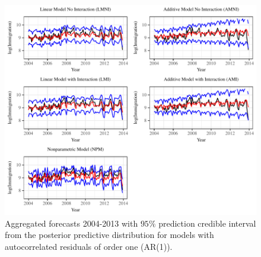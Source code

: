 \documentclass{article}\usepackage[]{graphicx}\usepackage[]{color}
\begin{document}
\begin{table} \centering 
\caption{2nd order Fourier models on Swiss Immigration Aggregated Data for Short and Long Run Predictions with AR(1) errors.} 
\label{RMSFE AR1} 
\end{table}

\begin{figure}[H]
\centering
\includegraphics[scale=1]{Short_run_results_AR1.pdf}
\caption{Aggregated forecasts 2004-2013 with $95\%$ prediction credible interval from the posterior predictive distribution for models with autocorrelated residuals of order one (AR(1)).}
\label{fig:prediction AR(1) short}
\end{figure}
\end{document}
